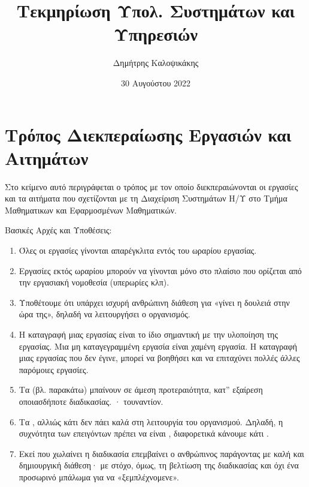\documentclass[letterpaper,10pt,greek]{sphinxhowto}
\title{Τεκμηρίωση Υπολ. Συστημάτων και Υπηρεσιών}
\date{30 Αυγούστου 2022}
\author{Δημήτρης Καλοψικάκης}
\begin{document}
\pagestyle{empty}
\sphinxmaketitle
\pagestyle{plain}
\sphinxtableofcontents
\pagestyle{normal}
\label{\detokenize{index::doc}}


\sphinxstepscope


\section{Τρόπος Διεκπεραίωσης Εργασιών και Αιτημάτων}
\label{\detokenize{PolicyTicket:id1}}\label{\detokenize{PolicyTicket::doc}}
\sphinxAtStartPar
Στο κείμενο αυτό περιγράφεται ο τρόπος με τον οποίο
διεκπεραιώνονται οι εργασίες και τα αιτήματα που σχετίζονται
με τη Διαχείριση Συστημάτων Η/Υ στο Τμήμα Μαθηματικων και Εφαρμοσμένων Μαθηματικών.

\sphinxAtStartPar
Βασικές Αρχές και Υποθέσεις:
\begin{enumerate}
%
\item {} 
\sphinxAtStartPar
Όλες οι εργασίες γίνονται απαρέγκλιτα εντός του ωραρίου εργασίας.

\item {} 
\sphinxAtStartPar
Εργασίες εκτός ωραρίου μπορούν να γίνονται μόνο στο πλαίσιο που ορίζεται από την εργασιακή νομοθεσία (υπερωρίες κλπ).

\item {} 
\sphinxAtStartPar
Υποθέτουμε ότι υπάρχει ισχυρή ανθρώπινη διάθεση για «γίνει η δουλειά στην ώρα της», δηλαδή να λειτουργήσει ο οργανισμός.

\item {} 
\sphinxAtStartPar
Η καταγραφή μιας εργασίας είναι  το ίδιο σημαντική με την υλοποίηση της εργασίας. Μια μη καταγεγραμμένη εργασία είναι χαμένη εργασία. Η καταγραφή μιας εργασίας που δεν έγινε, μπορεί να βοηθήσει και να επιταχύνει πολλές άλλες παρόμοιες εργασίες.

\item {} 
\sphinxAtStartPar
Τα  (βλ. παρακάτω) μπαίνουν σε άμεση προτεραιότητα, κατ” εξαίρεση οποιασδήποτε διαδικασίας. · τουναντίον.

\item {} 
\sphinxAtStartPar
Τα , αλλιώς κάτι δεν πάει καλά στη λειτουργία του οργανισμού. Δηλαδή, η συχνότητα των επειγόντων πρέπει να είναι , διαφορετικά κάνουμε κάτι .

\item {} 
\sphinxAtStartPar
Εκεί που χωλαίνει η διαδικασία επεμβαίνει ο ανθρώπινος παράγοντας με καλή και δημιουργική διάθεση· με στόχο, όμως, τη βελτίωση της διαδικασίας και όχι ένα προσωρινό μπάλωμα για να «ξεμπλέχνομενε».

\end{enumerate}
\end{document}
